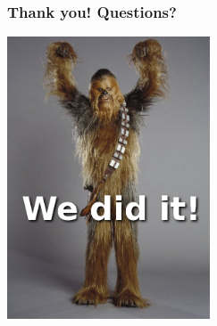 \documentclass{beamer}
\begin{document}
\begin{frame}
\frametitle{Thank you! Questions?}
\begin{center}
\includegraphics[width=0.45\textwidth]{img/chubaka}
\end{center}
\end{frame}
\end{document}

